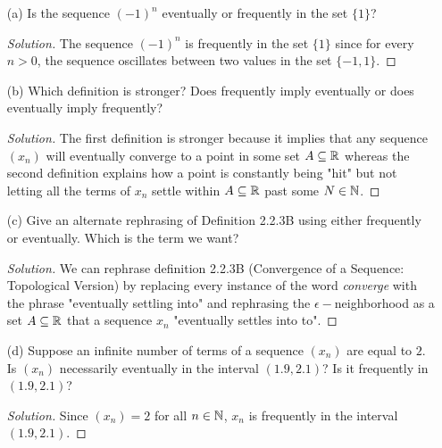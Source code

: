 \begin{enumerate}
    \item[(a)] Is the sequence \( (-1)^n \) eventually or frequently in the set \( \{ 1 \}\)? 
        \begin{proof}[Solution]
        The sequence \(  (-1)^n\) is frequently in the set \( \{ 1 \}\) since for every \( n > 0 \), the sequence oscillates between two values in the set \( \{  -1, 1 \}\).
        \end{proof}
    \item[(b)] Which definition is stronger? Does frequently imply eventually or does eventually imply frequently?
        \begin{proof}[Solution]
        The first definition is stronger because it implies that any sequence \( (x_n)\) will eventually converge to a point in some set \( A \subseteq \mathbb{R} \) whereas the second definition explains how a point is constantly being "hit" but not letting all the terms of \( x_n\) settle within \( A \subseteq \mathbb{R} \) past some \( N \in \mathbb{N} \).
        \end{proof}
    \item[(c)] Give an alternate rephrasing of Definition 2.2.3B using either frequently or eventually. Which is the term we want? 
        \begin{proof}[Solution]
        We can rephrase definition 2.2.3B (Convergence of a Sequence: Topological Version) 
by replacing every instance of the word \textit{converge} with the phrase "eventually settling into" and rephrasing the \( \epsilon-\)neighborhood as a set \( A \subseteq \mathbb{R} \) that a sequence  \( x_n \) "eventually settles into to".




        \end{proof}
    \item[(d)] Suppose an infinite number of terms of a sequence \( (x_n)\) are equal to \( 2 \). Is \( (x_n)\) necessarily eventually in the interval \( (1.9, 2.1)\)? Is it frequently in \( (1.9,2.1)\)?
        \begin{proof}[Solution]
        Since \( (x_n) = 2 \) for all \( n \in \mathbb{N} \), \( x_n \) is frequently in the interval \( (1.9,2.1)\).
        \end{proof}
\end{enumerate}
























